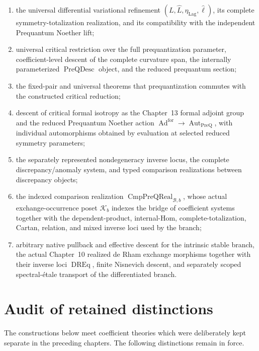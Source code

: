 \begin{enumerate}
\item the universal differential variational refinement
      $(L,\widehat L,\eta_{\mathrm{Lag}},\widehat\ell)$, its complete
      symmetry-totalization realization, and its compatibility with the
      independent Prequantum Noether lift;
\item universal critical restriction over the full prequantization parameter,
      coefficient-level descent of the complete curvature span, the internally
      parameterized $\operatorname{PreQDesc}$ object, and the reduced prequantum
      section;
\item the fixed-pair and universal theorems that prequantization commutes with the
      constructed critical reduction;
\item descent of critical formal isotropy as the Chapter~13 formal adjoint
      group and the reduced Prequantum Noether action
      $\operatorname{Ad}^{\mathrm{for}}\to\operatorname{Aut}_{\mathrm{PreQ}}$,
      with individual automorphisms obtained by evaluation at selected reduced
      symmetry parameters;
\item the separately represented nondegeneracy inverse locus, the complete
      discrepancy/anomaly system, and typed comparison realizations between
      discrepancy objects;
\item the indexed comparison realization
      $\operatorname{CmpPreQReal}_{\mathcal B,b}$, whose actual exchange-occurrence
      poset $\mathcal K_b$ indexes the bridge of coefficient systems together
      with the dependent-product, internal-Hom, complete-totalization, Cartan,
      relation, and mixed inverse loci used by the branch;
\item arbitrary native pullback and effective descent for the intrinsic stable
      branch, the actual Chapter~10 realized de Rham exchange morphisms together
      with their inverse loci $\operatorname{DREq}$, finite Nisnevich descent, and
      separately scoped spectral-\'etale transport of the differentiated branch.
\end{enumerate}

\section{Audit of retained distinctions}
\label{sec:prequantum-audit-retained-distinctions}

The constructions below meet coefficient theories which were deliberately kept
separate in the preceding chapters.  The following distinctions remain in force.

